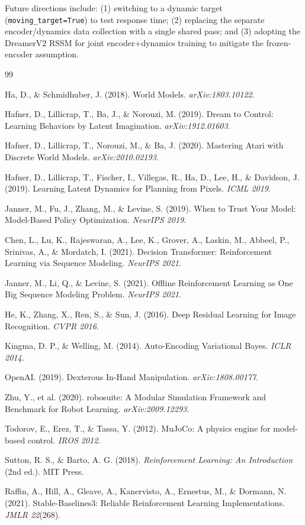 \documentclass{article}
\begin{document}
Future directions include: (1) switching to a dynamic target (\texttt{moving\_target=True})
to test response time; (2) replacing the separate encoder/dynamics data collection with a
single shared pass; and (3) adopting the DreamerV2 RSSM for joint encoder+dynamics training
to mitigate the frozen-encoder assumption.



\begin{thebibliography}{99}

Ha, D., \& Schmidhuber, J. (2018).
World Models.
\emph{arXiv:1803.10122}.

Hafner, D., Lillicrap, T., Ba, J., \& Norouzi, M. (2019).
Dream to Control: Learning Behaviors by Latent Imagination.
\emph{arXiv:1912.01603}.

Hafner, D., Lillicrap, T., Norouzi, M., \& Ba, J. (2020).
Mastering Atari with Discrete World Models.
\emph{arXiv:2010.02193}.

Hafner, D., Lillicrap, T., Fischer, I., Villegas, R., Ha, D., Lee, H., \& Davidson, J. (2019).
Learning Latent Dynamics for Planning from Pixels.
\emph{ICML 2019}.

Janner, M., Fu, J., Zhang, M., \& Levine, S. (2019).
When to Trust Your Model: Model-Based Policy Optimization.
\emph{NeurIPS 2019}.

Chen, L., Lu, K., Rajeswaran, A., Lee, K., Grover, A., Laskin, M., Abbeel, P., Srinivas, A., \& Mordatch, I. (2021).
Decision Transformer: Reinforcement Learning via Sequence Modeling.
\emph{NeurIPS 2021}.

Janner, M., Li, Q., \& Levine, S. (2021).
Offline Reinforcement Learning as One Big Sequence Modeling Problem.
\emph{NeurIPS 2021}.

He, K., Zhang, X., Ren, S., \& Sun, J. (2016).
Deep Residual Learning for Image Recognition.
\emph{CVPR 2016}.

Kingma, D. P., \& Welling, M. (2014).
Auto-Encoding Variational Bayes.
\emph{ICLR 2014}.

OpenAI. (2019).
Dexterous In-Hand Manipulation.
\emph{arXiv:1808.00177}.

Zhu, Y., et al. (2020).
robosuite: A Modular Simulation Framework and Benchmark for Robot Learning.
\emph{arXiv:2009.12293}.

Todorov, E., Erez, T., \& Tassa, Y. (2012).
MuJoCo: A physics engine for model-based control.
\emph{IROS 2012}.

Sutton, R. S., \& Barto, A. G. (2018).
\emph{Reinforcement Learning: An Introduction} (2nd ed.).
MIT Press.

Raffin, A., Hill, A., Gleave, A., Kanervisto, A., Ernestus, M., \& Dormann, N. (2021).
Stable-Baselines3: Reliable Reinforcement Learning Implementations.
\emph{JMLR 22}(268).

\end{thebibliography}
\end{document}
